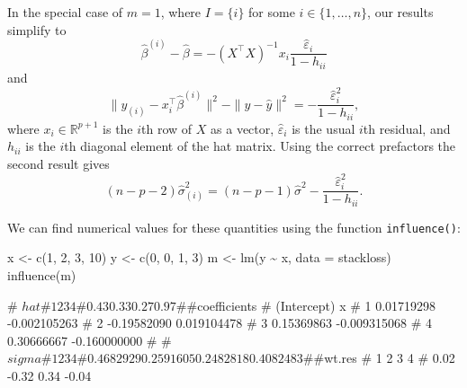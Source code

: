 \documentclass[
  a4paper,
]{article}
\newenvironment{Shaded}{\begin{snugshade}}{\end{snugshade}}
\newcommand{\AttributeTok}[1]{\textcolor[rgb]{0.77,0.63,0.00}{#1}}
\newcommand{\DecValTok}[1]{\textcolor[rgb]{0.00,0.00,0.81}{#1}}
\newcommand{\FunctionTok}[1]{\textcolor[rgb]{0.00,0.00,0.00}{#1}}
\newcommand{\NormalTok}[1]{#1}
\newcommand{\OtherTok}[1]{\textcolor[rgb]{0.56,0.35,0.01}{#1}}
\newcommand{\SpecialCharTok}[1]{\textcolor[rgb]{0.00,0.00,0.00}{#1}}
\theoremstyle{definition}
\theoremstyle{definition}
\theoremstyle{definition}
\theoremstyle{definition}
\theoremstyle{remark}
\begin{document}
In the special case of \(m = 1\), where \(I = \{i\}\) for some
\(i \in \{1, \ldots, n\}\), our results simplify to
\begin{equation}
  \hat\beta^{(i)} - \hat\beta
    = - (X^\top X)^{-1} x_i \frac{\hat\varepsilon_i}{1 - h_{ii}} \label{eq:dbeta-i}
\end{equation}
and
\begin{equation*}
  \| y_{(i)} - x_i^\top \hat\beta^{(i)} \|^2 - \| y - \hat y \|^2
    = - \frac{\hat\varepsilon_i^2}{1 - h_{ii}},
\end{equation*}
where \(x_i \in \mathbb{R}^{p+1}\) is the \(i\)th row of \(X\) as a vector,
\(\hat\varepsilon_i\) is the usual \(i\)th residual,
and \(h_{ii}\) is the \(i\)th diagonal element of the hat matrix.
Using the correct prefactors the second result gives
\begin{equation*}
  (n-p-2) \hat\sigma_{(i)}^2
    = (n-p-1)\hat\sigma^2 - \frac{\hat\varepsilon_i^2}{1 - h_{ii}}.
\end{equation*}

We can find numerical values for these quantities using
the function \texttt{influence()}:

\begin{Shaded}
\begin{Highlighting}[]
\NormalTok{x }\OtherTok{\textless{}{-}} \FunctionTok{c}\NormalTok{(}\DecValTok{1}\NormalTok{, }\DecValTok{2}\NormalTok{, }\DecValTok{3}\NormalTok{, }\DecValTok{10}\NormalTok{)}
\NormalTok{y }\OtherTok{\textless{}{-}} \FunctionTok{c}\NormalTok{(}\DecValTok{0}\NormalTok{, }\DecValTok{0}\NormalTok{, }\DecValTok{1}\NormalTok{, }\DecValTok{3}\NormalTok{)}
\NormalTok{m }\OtherTok{\textless{}{-}} \FunctionTok{lm}\NormalTok{(y }\SpecialCharTok{\textasciitilde{}}\NormalTok{ x, }\AttributeTok{data =}\NormalTok{ stackloss)}
\FunctionTok{influence}\NormalTok{(m)}
\end{Highlighting}
\end{Shaded}

\begin{Shaded}
\begin{Highlighting}[]
\NormalTok{\# $hat}
\NormalTok{\#    1    2    3    4 }
\NormalTok{\# 0.43 0.33 0.27 0.97 }
\NormalTok{\# }
\NormalTok{\# $coefficients}
\NormalTok{\#   (Intercept)            x}
\NormalTok{\# 1  0.01719298 {-}0.002105263}
\NormalTok{\# 2 {-}0.19582090  0.019104478}
\NormalTok{\# 3  0.15369863 {-}0.009315068}
\NormalTok{\# 4  0.30666667 {-}0.160000000}
\NormalTok{\# }
\NormalTok{\# $sigma}
\NormalTok{\#         1         2         3         4 }
\NormalTok{\# 0.4682929 0.2591605 0.2482818 0.4082483 }
\NormalTok{\# }
\NormalTok{\# $wt.res}
\NormalTok{\#     1     2     3     4 }
\NormalTok{\#  0.02 {-}0.32  0.34 {-}0.04}
\end{Highlighting}
\end{Shaded}
\end{document}
